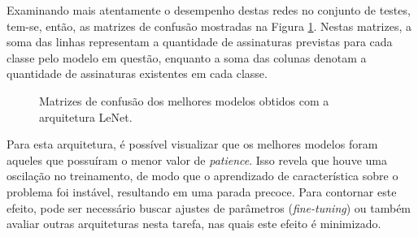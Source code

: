 Examinando mais atentamente o desempenho destas redes no conjunto de testes, tem-se, então, as matrizes de confusão mostradas na Figura \ref{fig:matrizes-lenet}. Nestas matrizes, a soma das linhas representam a quantidade de assinaturas previstas para cada classe pelo modelo em questão, enquanto a soma das colunas denotam a quantidade de assinaturas existentes em cada classe.

\begin{figure}[H]
	\centering
	\caption{Matrizes de confusão dos melhores modelos obtidos com a arquitetura LeNet.}\label{fig:matrizes-lenet}
	\hfill
\end{figure}


Para esta arquitetura, é possível visualizar que os melhores modelos foram aqueles que possuíram o menor valor de \emph{patience}. Isso revela que houve uma oscilação no treinamento, de modo que o aprendizado de característica sobre o problema foi instável, resultando em uma parada precoce. Para contornar este efeito, pode ser necessário buscar ajustes de parâmetros (\emph{fine-tuning}) ou também avaliar outras arquiteturas nesta tarefa, nas quais este efeito é minimizado.

